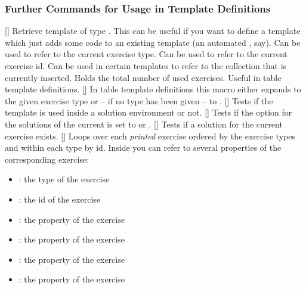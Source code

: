 \documentclass{xsim-manual}
\begin{document}
\subsubsection{Further Commands for Usage in Template Definitions}
\begin{commands}
  []
    Retrieve template  of type .  This can be useful if
    you want to define a template which just adds some code to an existing
    template (an automated , say).
  \expandable{}
    Can be used to refer to the current exercise type.
  \expandable{}
    Can be used to refer to the current exercise id.
  \expandable{}
    Can be used in certain templates to refer to the collection that is
    currently inserted.
  \expandable{}
    Holds the total number of used exercises.  Useful in table template
    definitions.
  \expandable{}[]
    In table template definitions this macro either expands to the given
    exercise type or -- if no type has been given -- to .
  \expandable{}[]
    Tests if the template is used inside a solution environment or not.
  \expandable{}[]
    Tests if the option  for the solutions of the current
     is set to  or .
  []
    Tests if a solution for the current exercise exists.
  []
    Loops over each \emph{printed} exercise ordered by the exercise types and
    within each type by id.  Inside  you can refer to several
    properties of the corresponding exercise:
    \begin{itemize}
      \item {}: the type of the exercise
      \item {}: the id of the exercise
      \item {}: the  property of the exercise
      \item {}: the  property of the exercise
      \item {}: the  property of the exercise
      \item {}: the  property of the exercise
    \end{itemize}

\end{commands}
\end{document}
